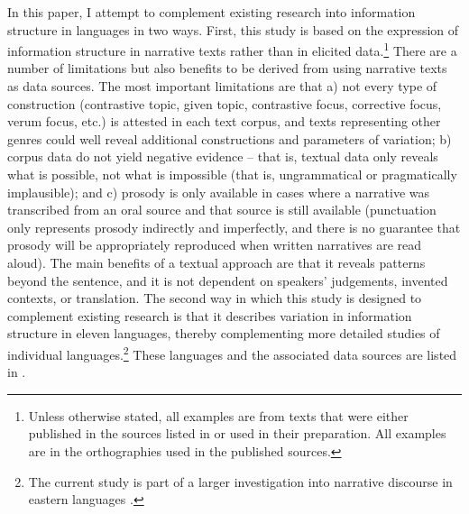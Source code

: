\documentclass[output=paper]{langsci/langscibook}
\begin{document}
In this paper, I attempt to complement existing research into information structure in  languages in two ways. First, this study is based on the expression of information structure in narrative texts rather than in elicited data.\footnote{Unless otherwise stated, all examples are from texts that were either published in the sources listed in  or used in their preparation. All examples are in the orthographies used in the published sources.} There are a number of limitations but also benefits to be derived from using narrative texts as data sources. The most important limitations are that a) not every type of construction (contrastive topic, given topic, contrastive focus, corrective focus, verum focus, etc.) is attested in each text corpus, and texts representing other genres could well reveal additional constructions and parameters of variation; b) corpus data do not yield negative evidence -- that is, textual data only reveals what is possible, not what is impossible (that is, ungrammatical or pragmatically implausible); and c) prosody is only available in cases where a narrative was transcribed from an oral source and that source is still available (punctuation only represents prosody indirectly and imperfectly, and there is no guarantee that prosody will be appropriately reproduced when written narratives are read aloud). The main benefits of a textual approach are that it reveals patterns beyond the sentence, and it is not dependent on speakers’ judgements, invented contexts, or translation. The second way in which this study is designed to complement existing research is that it describes variation in information structure in eleven  languages, thereby complementing more detailed studies of individual languages.\footnote{The current study is part of a larger investigation into narrative discourse in eastern  languages \citep{nicolle2015b}.} These languages and the associated data sources are listed in .
\end{document}
